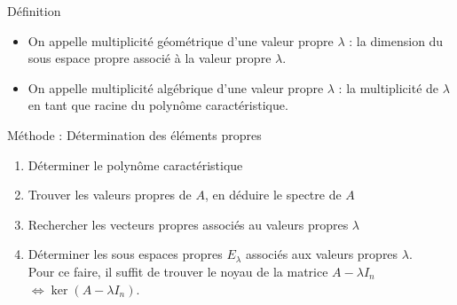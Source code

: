 \begin{bclogo}[couleur=blue!30,couleurBord=blue,arrondi=0.1,logo=\bcbook,ombre=true]{Définition}
\begin{itemize}
    \item On appelle multiplicité géométrique d'une valeur propre $\lambda$ : la dimension du sous espace propre associé à la valeur propre $\lambda$.
    \item On appelle multiplicité algébrique d'une valeur propre $\lambda$ : la multiplicité de $\lambda$ en tant que racine du polynôme caractéristique.
\end{itemize}
\end{bclogo}

\begin{bclogo}[logo=\bclampe,arrondi=0.1,ombre=true, couleur=yellow!60,couleurBord=yellow]{Méthode : Détermination des éléments propres}
\begin{enumerate}
    \item Déterminer le polynôme caractéristique
    \item Trouver les valeurs propres de $A$, en déduire le spectre de $A$
    \item Rechercher les vecteurs propres associés au valeurs propres $\lambda$
    \item Déterminer les sous espaces propres $E_{\lambda}$ associés aux valeurs propres $\lambda$.\\
    Pour ce faire, il suffit de trouver le noyau de la matrice $A-\lambda I_n$ $\Leftrightarrow \ker(A-\lambda I_n)$.\\
\end{enumerate}
\end{bclogo}
